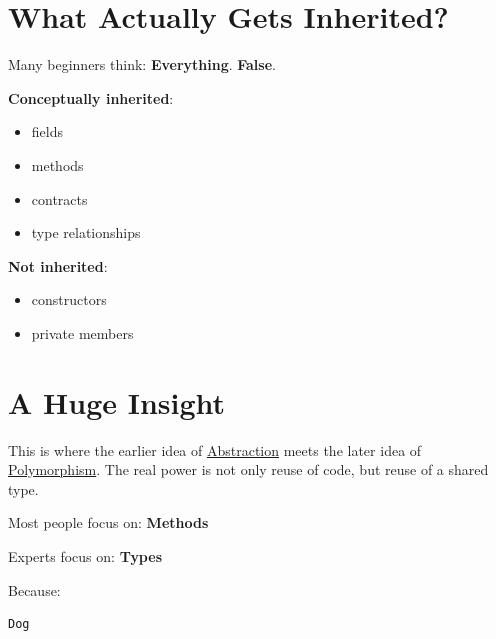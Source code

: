 \documentclass[11pt,a4paper]{book}
\begin{document}

\section{What Actually Gets Inherited?}

Many beginners think: \textbf{Everything}.
\textcolor{RosettaRed}{\textbf{False}}.


\textbf{Conceptually inherited}:

\begin{itemize}
\item fields
\item methods
\item contracts
\item type relationships
\end{itemize}


\textbf{Not inherited}:

\begin{itemize}
\item constructors
\item private members
\end{itemize}


\section{A Huge Insight}

This is where the earlier idea of \hyperref[chap:abstraction]{Abstraction} meets the later idea of \hyperref[chap:polymorphism]{Polymorphism}. The real power is not only reuse of code, but reuse of a shared type.

Most people focus on: \textbf{\textcolor{RosettaDeepGreen}{Methods}}


Experts focus on: \textbf{\textcolor{RosettaDeepGreen}{Types}}

\newpage
Because:

\begin{verbatim}
Dog
\end{verbatim}
\end{document}
